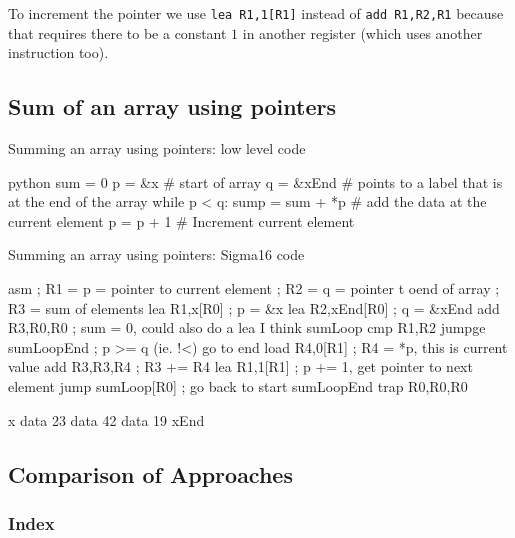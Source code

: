 \begin{note}
    To increment the pointer we use \texttt{lea R1,1[R1]} instead of \texttt{add R1,R2,R1} because that requires there to be a constant \(1\) in another register (which uses another instruction too).
\end{note}

\subsection{Sum of an array using pointers}\label{sub:sum_of_an_array_using_pointers}
\begin{highlight}{Summing an array using pointers: low level code}
    \begin{code}{python}
        sum = 0
        p = &x # start of array
        q = &xEnd # points to a label that is at the end of the array
        while p < q:
        sump = sum + *p # add the data at the current element
        p = p + 1 # Increment current element
    \end{code}
\end{highlight}
\begin{highlight}{Summing an array using pointers: Sigma16 code}
    \begin{code}{asm}
        ; R1 = p = pointer to current element
        ; R2 = q = pointer t oend of array
        ; R3 = sum of elements
        lea R1,x[R0] ; p = &x
        lea R2,xEnd[R0] ; q = &xEnd
        add R3,R0,R0 ; sum = 0, could also do a lea I think
        sumLoop
        cmp R1,R2
        jumpge sumLoopEnd ; p >= q  (ie. !<) go to end
        load R4,0[R1] ; R4 = *p, this is current value
        add R3,R3,R4 ; R3 += R4
        lea R1,1[R1] ; p += 1, get pointer to next element
        jump sumLoop[R0] ; go back to start
        sumLoopEnd
        trap R0,R0,R0

        x   data 23
        data 42
        data 19
        xEnd
    \end{code}
\end{highlight}

\subsection{Comparison of Approaches}\label{sub:comparison_of_approaches}

\subsubsection{Index}\label{ssub:index}

